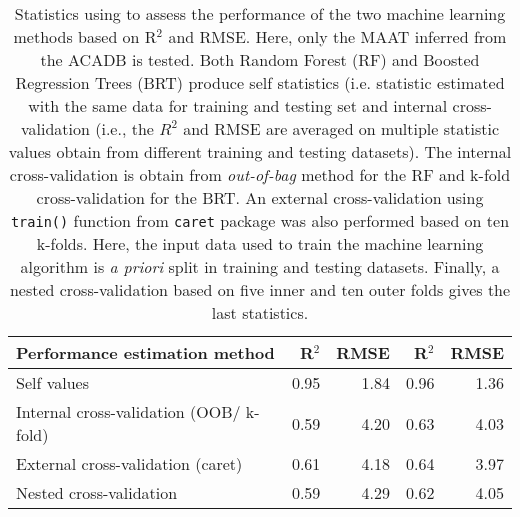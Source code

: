 \begin{table}[ht]
\centering
\caption{Statistics using to assess the performance of the two machine learning methods based on R$^2$ and RMSE. Here, only the MAAT inferred from the ACADB is tested. Both Random Forest (RF) and Boosted Regression Trees (BRT) produce self statistics (i.e. statistic estimated with the same data for training and testing set and internal cross-validation (i.e., the $R^2$ and RMSE are averaged on multiple statistic values obtain from different training and testing datasets). The internal cross-validation is obtain from \textit{out-of-bag} method for the RF and k-fold cross-validation for the BRT. An external cross-validation using \texttt{train()} function from \texttt{caret} package was also performed based on ten k-folds. Here, the input data used to train the machine learning algorithm is \textit{a priori} split in training and testing datasets. Finally, a nested cross-validation based on five inner and ten outer folds gives the last statistics.} 
\label{FT_table}
\begin{tabular}{lrrrr}
  \toprule
\textbf{Performance estimation method} & R$^2$ & RMSE & R$^2$ & RMSE \\ 
  \midrule
Self values & 0.95 & 1.84 & 0.96 & 1.36 \\ 
  Internal cross-validation (OOB/ k-fold) & 0.59 & 4.20 & 0.63 & 4.03 \\ 
  External cross-validation (caret) & 0.61 & 4.18 & 0.64 & 3.97 \\ 
  Nested cross-validation & 0.59 & 4.29 & 0.62 & 4.05 \\ 
   \bottomrule
\end{tabular}
\end{table}
